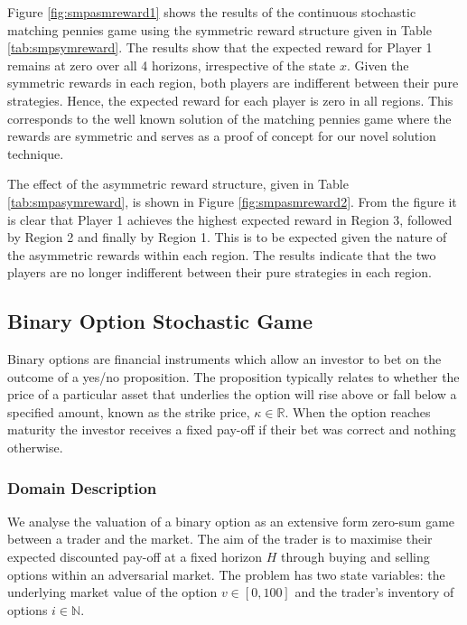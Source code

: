 Figure \ref{fig:smpasmreward1} shows the results of the continuous
stochastic matching pennies game using the symmetric reward structure
given in Table \ref{tab:smpsymreward}. 
The results show that the expected reward for Player 1 remains at zero
over all 4 horizons, irrespective of the state $x$. Given the symmetric
rewards in each region, both players are indifferent between their 
pure strategies. Hence, the expected reward for each player is zero in
all regions. This corresponds to the well known solution of the 
matching pennies game where the rewards are symmetric and serves 
as a proof of concept for our novel solution technique.

The effect of the asymmetric reward structure, given in Table \ref{tab:smpasymreward}, 
is shown in Figure \ref{fig:smpasmreward2}. From the figure it is clear that Player 1 achieves the highest expected
reward in Region 3, followed by Region 2 and finally by Region 1. This
is to be expected given the nature of the asymmetric rewards within
each region. The results indicate that the two players are
no longer indifferent between their pure strategies in each region. 

\subsection{Binary Option Stochastic Game}

Binary options are financial instruments which allow an investor to
bet on the outcome of a yes/no proposition. The proposition typically
relates to whether the price of a particular asset that underlies the option
will rise above or fall below a specified amount, known as the strike
price, $\kappa \in \mathbb{R}$. When the option reaches maturity the 
investor receives a fixed pay-off if their bet was correct and nothing otherwise.

\subsubsection{Domain Description}

We analyse the valuation of a binary option as an extensive form
zero-sum game between a trader and the market. The aim of the trader
is to maximise their expected discounted pay-off at a fixed horizon $H$ 
through buying and selling options within an adversarial market. 
The problem has two state variables: the underlying market value of the option
$v \in [0, 100]$ and the trader's inventory of options $i \in \mathbb{N}$.

